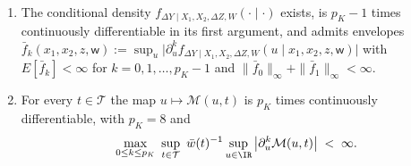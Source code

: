 \begin{assumption}\label{ass:app2}~
\begin{enumerate}
\item[(i)] The conditional density $f_{\Delta Y\mid X_1,X_2,\Delta Z,W}(\cdot\mid\cdot)$ exists, is
$p_K-1$ times continuously differentiable in its first argument, and admits envelopes
$\bar f_k(x_1,x_2,z,\mathsf w):=\sup_{u}\big|\partial_u^{k}f_{\Delta Y\mid X_1,X_2,\Delta Z,W}(u\mid x_1,x_2,z,\mathsf w)\big|$
with $E[\bar f_k]<\infty$ for $k=0,1,\dots,p_K-1$ and $\|\bar f_0\|_\infty+\|\bar f_1\|_\infty<\infty$.

\item[(ii)] For every $t\in\mathcal T$ the map $u\mapsto\mathcal M(u,t)$ is $p_K$ times continuously
differentiable, with $p_K=8$ and
\[
\max_{0\le k\le p_K}\ \sup_{t\in\mathcal T}\ \bar w(t)^{-1}\sup_{u\in\IR}\big|\partial_u^{k}\mathcal M(u,t)\big|\;<\;\infty .
\]
\end{enumerate}
\end{assumption}

%
%
%

